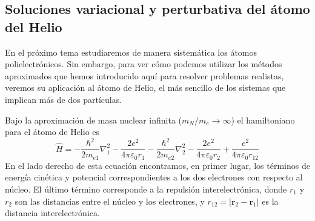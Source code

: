 \documentclass{tufte-handout}
\begin{document}

\subsection{Soluciones variacional y perturbativa del átomo del Helio}
En el próximo tema estudiaremos de manera sistemática 
los átomos polielectrónicos. Sin embargo, para ver cómo 
podemos utilizar los métodos aproximados que hemos introducido
aquí para resolver
problemas realistas, veremos su aplicación al
átomo de Helio, el más sencillo de los sistemas que
implican más de dos partículas. 

Bajo la aproximación de masa
nuclear infinita ($m_N/m_e\rightarrow \infty$)
el hamiltoniano para el átomo de Helio es
\begin{equation}
    \hat{H} = -\frac{\hbar^2}{2m_{e1}}\nabla^2_1 
    - \frac{2e^2}{4\pi\varepsilon_0r_1} 
    -\frac{\hbar^2}{2m_{e2}}\nabla^2_2 
    - \frac{2e^2}{4\pi\varepsilon_0r_2} 
            + \frac{e^2}{4\pi\varepsilon_0r_{12}}
\end{equation}
En el lado derecho de esta ecuación encontramos, en
primer lugar, los términos de energía
cinética y potencial correspondientes a los dos electrones
con respecto al núcleo. El último término corresponde a
la repulsión interelectrónica, donde $r_1$ y $r_2$ son las
distancias entre el núcleo y los electrones, y 
$r_{12}=|\mathbf{r}_2 - \mathbf{r}_1|$ 
es la distancia interelectrónica.
\end{document}
